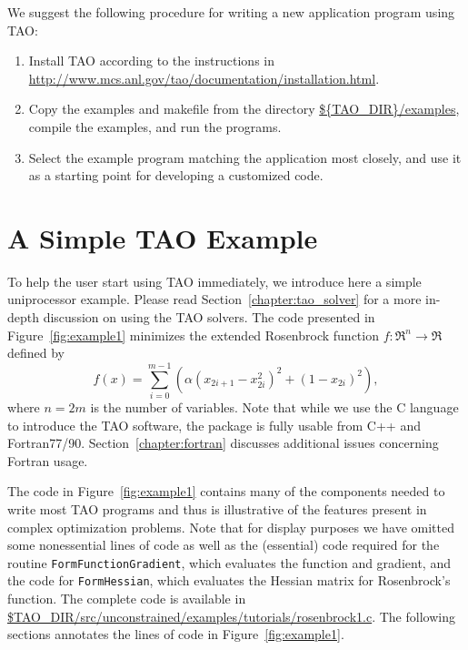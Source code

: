 We suggest the following procedure for writing a new application
program using TAO:

\begin{enumerate}
\item Install TAO according to the instructions in
  \url{http://www.mcs.anl.gov/tao/documentation/installation.html}.
\item Copy the examples and makefile from the directory
  \url{${TAO\_DIR}/examples}, %
  compile the examples, and run the programs. 
\item Select the example program matching the application most
  closely, and use it as a starting point for developing a customized
  code.
\end{enumerate}

\section{A Simple TAO Example}
\label{sec:simple}

To help the user start using TAO immediately, we introduce here a simple
uniprocessor example. Please read Section~\ref{chapter:tao_solver} for a 
more in-depth discussion on using the TAO solvers.
The code presented in Figure~\ref{fig:example1} minimizes the
extended Rosenbrock function $f: \Re^n \to \Re$ defined by
\[
 f(x) = 
 \sum_{i=0}^{m-1} \left( \alpha(x_{2i+1}-x_{2i}^2)^2 + (1-x_{2i})^2 \right),
\]
where $n = 2m$ is the number of variables.  Note that while we use the C 
language to introduce the TAO software, the package is fully usable from 
C++ and Fortran77/90.  Section~\ref{chapter:fortran} discusses additional 
issues concerning Fortran usage.



The code in Figure~\ref{fig:example1} contains many of the components
needed to write most TAO programs and thus is illustrative of the
features present in complex optimization problems.  Note that for
display purposes we have omitted some nonessential lines of code as well as the
(essential) code required for the routine \texttt{FormFunctionGradient},
which evaluates the function and gradient, and the code for
\texttt{FormHessian}, which evaluates the Hessian matrix for Rosenbrock's
function. The complete code is available in \url{$TAO\_DIR/src/unconstrained/examples/tutorials/rosenbrock1.c}. %
The following sections annotates the lines of code in
Figure~\ref{fig:example1}.

